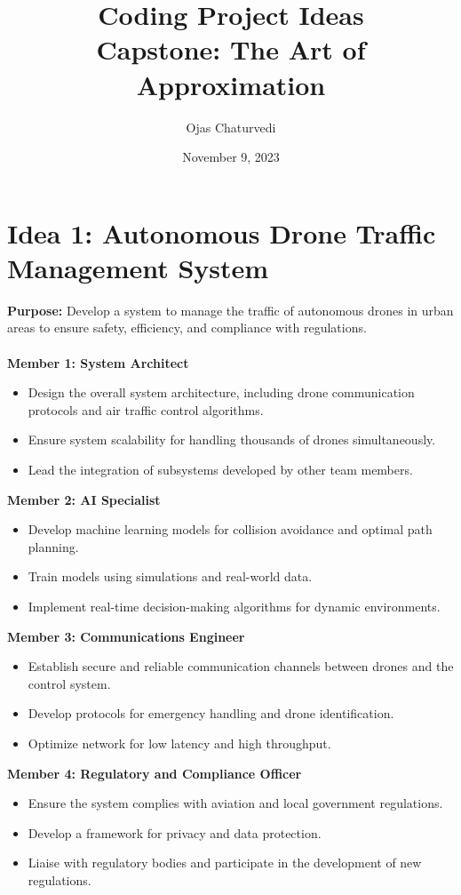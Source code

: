 \documentclass{article}
\title{Coding Project Ideas \\ \large Capstone: The Art of Approximation}
\author{Ojas Chaturvedi}
\date{November 9, 2023}
\begin{document}
\begin{titlingpage}
    \maketitle
    \tableofcontents
\end{titlingpage}


\section{Idea 1: Autonomous Drone Traffic Management System}
    \textbf{Purpose:} Develop a system to manage the traffic of autonomous drones in urban areas to ensure safety, efficiency, and compliance with regulations. \\ \\
    \textbf{Member 1: System Architect}
        \begin{itemize}
            \item Design the overall system architecture, including drone communication protocols and air traffic control algorithms.
            \item Ensure system scalability for handling thousands of drones simultaneously.
            \item Lead the integration of subsystems developed by other team members.
        \end{itemize}
    \textbf{Member 2: AI Specialist}
        \begin{itemize}
            \item Develop machine learning models for collision avoidance and optimal path planning.
            \item Train models using simulations and real-world data.
            \item Implement real-time decision-making algorithms for dynamic environments.
        \end{itemize}
    \textbf{Member 3: Communications Engineer}
        \begin{itemize}
            \item Establish secure and reliable communication channels between drones and the control system.
            \item Develop protocols for emergency handling and drone identification.
            \item Optimize network for low latency and high throughput.
        \end{itemize}
    \textbf{Member 4: Regulatory and Compliance Officer}
        \begin{itemize}
            \item Ensure the system complies with aviation and local government regulations.
            \item Develop a framework for privacy and data protection.
            \item Liaise with regulatory bodies and participate in the development of new regulations.
        \end{itemize}
\end{document}
